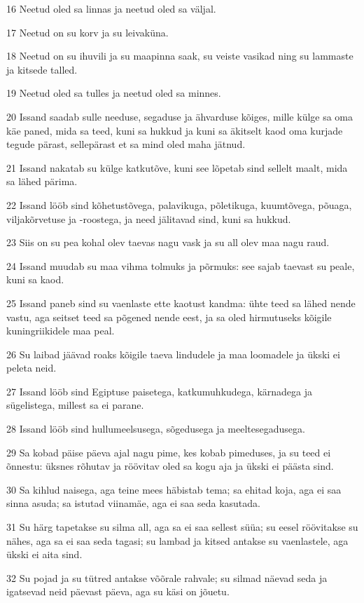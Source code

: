 \par 16 Neetud oled sa linnas ja neetud oled sa väljal.
\par 17 Neetud on su korv ja su leivaküna.
\par 18 Neetud on su ihuvili ja su maapinna saak, su veiste vasikad ning su lammaste ja kitsede talled.
\par 19 Neetud oled sa tulles ja neetud oled sa minnes.
\par 20 Issand saadab sulle needuse, segaduse ja ähvarduse kõiges, mille külge sa oma käe paned, mida sa teed, kuni sa hukkud ja kuni sa äkitselt kaod oma kurjade tegude pärast, sellepärast et sa mind oled maha jätnud.
\par 21 Issand nakatab su külge katkutõve, kuni see lõpetab sind sellelt maalt, mida sa lähed pärima.
\par 22 Issand lööb sind kõhetustõvega, palavikuga, põletikuga, kuumtõvega, põuaga, viljakõrvetuse ja -roostega, ja need jälitavad sind, kuni sa hukkud.
\par 23 Siis on su pea kohal olev taevas nagu vask ja su all olev maa nagu raud.
\par 24 Issand muudab su maa vihma tolmuks ja põrmuks: see sajab taevast su peale, kuni sa kaod.
\par 25 Issand paneb sind su vaenlaste ette kaotust kandma: ühte teed sa lähed nende vastu, aga seitset teed sa põgened nende eest, ja sa oled hirmutuseks kõigile kuningriikidele maa peal.
\par 26 Su laibad jäävad roaks kõigile taeva lindudele ja maa loomadele ja ükski ei peleta neid.
\par 27 Issand lööb sind Egiptuse paisetega, katkumuhkudega, kärnadega ja sügelistega, millest sa ei parane.
\par 28 Issand lööb sind hullumeelsusega, sõgedusega ja meeltesegadusega.
\par 29 Sa kobad päise päeva ajal nagu pime, kes kobab pimeduses, ja su teed ei õnnestu: üksnes rõhutav ja röövitav oled sa kogu aja ja ükski ei päästa sind.
\par 30 Sa kihlud naisega, aga teine mees häbistab tema; sa ehitad koja, aga ei saa sinna asuda; sa istutad viinamäe, aga ei saa seda kasutada.
\par 31 Su härg tapetakse su silma all, aga sa ei saa sellest süüa; su eesel röövitakse su nähes, aga sa ei saa seda tagasi; su lambad ja kitsed antakse su vaenlastele, aga ükski ei aita sind.
\par 32 Su pojad ja su tütred antakse võõrale rahvale; su silmad näevad seda ja igatsevad neid päevast päeva, aga su käsi on jõuetu.
